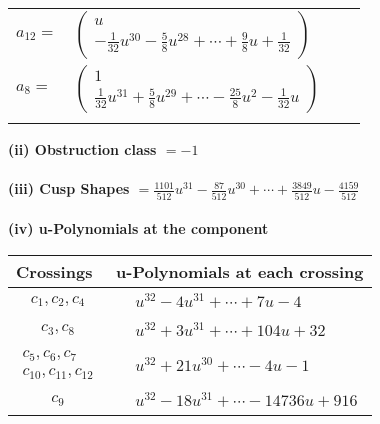 \documentclass[1p]{elsarticle_modified}
\theoremstyle{definition}
\begin{document}
\begin{tabular}{m{7pt} m{180pt} m{7pt} m{180pt} }
\flushright $a_{12}=$&$\begin{pmatrix}u\\-\frac{1}{32} u^{30}-\frac{5}{8} u^{28}+\cdots+\frac{9}{8} u+\frac{1}{32}\end{pmatrix}$ \\
\flushright $a_{8}=$&$\begin{pmatrix}1\\\frac{1}{32} u^{31}+\frac{5}{8} u^{29}+\cdots-\frac{25}{8} u^2-\frac{1}{32} u\end{pmatrix}$\\&\end{tabular}
\flushleft \textbf{(ii) Obstruction class $= -1$}\\~\\
\flushleft \textbf{(iii) Cusp Shapes $= \frac{1101}{512} u^{31}-\frac{87}{512} u^{30}+\cdots+\frac{3849}{512} u-\frac{4159}{512}$}\\~\\
\newpage\renewcommand{\arraystretch}{1}
\flushleft \textbf{(iv) u-Polynomials at the component}\newline \\
\begin{tabular}{m{50pt}|m{274pt}}
Crossings & \hspace{64pt}u-Polynomials at each crossing \\
\hline $$\begin{aligned}c_{1},c_{2},c_{4}\end{aligned}$$&$\begin{aligned}
&u^{32}-4 u^{31}+\cdots+7 u-4
\end{aligned}$\\
\hline $$\begin{aligned}c_{3},c_{8}\end{aligned}$$&$\begin{aligned}
&u^{32}+3 u^{31}+\cdots+104 u+32
\end{aligned}$\\
\hline $$\begin{aligned}c_{5},c_{6},c_{7}\\c_{10},c_{11},c_{12}\end{aligned}$$&$\begin{aligned}
&u^{32}+21 u^{30}+\cdots-4 u-1
\end{aligned}$\\
\hline $$\begin{aligned}c_{9}\end{aligned}$$&$\begin{aligned}
&u^{32}-18 u^{31}+\cdots-14736 u+916
\end{aligned}$\\
\hline
\end{tabular}\\~\\
\end{document}
